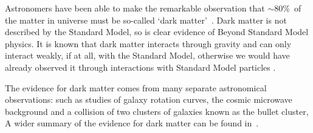 

Astronomers have been able to make the remarkable observation that
$\sim$80\%~of the matter in universe must be so-called `dark matter'~\cite{theo-bsm_dm_peskin}.
Dark matter is not described by the Standard Model,
so is clear evidence of Beyond Standard Model physics.
It is known that dark matter interacts through gravity
and can only interact weakly, if at all, with the Standard Model,
otherwise we would have already observed it through interactions with Standard Model particles .

The evidence for dark matter comes from many separate astronomical observations:
such as studies of
galaxy rotation curves,
the cosmic microwave background
and a collision of two clusters of galaxies known as the bullet cluster,
A wider summary of the evidence for dark matter can be found in~\cite{theo-bsm_dm_evidence}.

